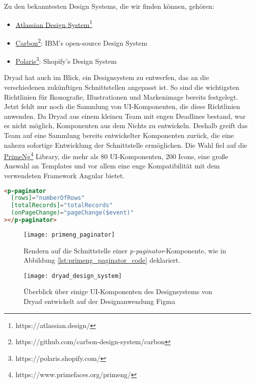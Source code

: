 Zu den bekanntesten Design Systems, die wir finden können, gehören:

\begin{itemize}
  \item \href{https://atlassian.design/}{Atlassian Design System}\footnote{https://atlassian.design/}
  \item \href{https://github.com/carbon-design-system/carbon}{Carbon}\footnote{https://github.com/carbon-design-system/carbon}: IBM’s open-source Design System
  \item \href{https://polaris.shopify.com/}{Polaris}\footnote{https://polaris.shopify.com/}: Shopify's Design System
\end{itemize}

Dryad hat auch im Blick, ein Designsystem zu entwerfen, das an die verschiedenen zukünftigen Schnittstellen angepasst ist.
So sind die wichtigsten Richtlinien für Ikonografie, Illustrationen und Markenimage bereits festgelegt.
Jetzt fehlt nur noch die Sammlung von \ac{UI}-Komponenten, die diese Richtlinien anwenden.
Da Dryad aus einem kleinen Team mit engen Deadlines bestand, war es nicht möglich, Komponenten aus dem Nichts zu entwickeln.
Deshalb greift das Team auf eine Sammlung bereits entwickelter Komponenten zurück, die eine nahezu sofortige Entwicklung der Schnittstelle ermöglichen.
Die Wahl fiel auf die \href{https://www.primefaces.org/primeng/}{PrimeNg}\footnote{https://www.primefaces.org/primeng/} Library, die mehr als 80 \ac{UI}-Komponenten, 200 Icons, eine große Auswahl an Templates und vor allem eine enge Kompatibilität mit dem verwendeten Framework Angular bietet.\\

\begin{lstlisting}[language=html,caption={Beispiel für die Verwendung der Komponente \textit{p-paginator}, mit der eine Schnittstelle mit Paging einfach verwaltet werden kann.},captionpos=b,label=lst:primeng_paginator_code]
<p-paginator
  [rows]="numberOfRows"
  [totalRecords]="totalRecords"
  (onPageChange)="pageChange($event)"
></p-paginator>
\end{lstlisting}

\begin{figure}[H]
  \centering
  \texttt{[image: primeng\_paginator]}
  \caption{Rendern auf die Schnittstelle einer \textit{p-paginator}-Komponente, wie in Abbildung \ref{lst:primeng_paginator_code} deklariert.}
  \label{fig:primeng_paginator}
\end{figure}

\begin{figure}[H]
  \centering
  \texttt{[image: dryad\_design\_system]}
  \caption{Überblick über einige \ac{UI}-Komponenten des Designsystems von Dryad entwickelt auf der Designanwendung Figma}
  \label{fig:dryad_design_system}
\end{figure}
